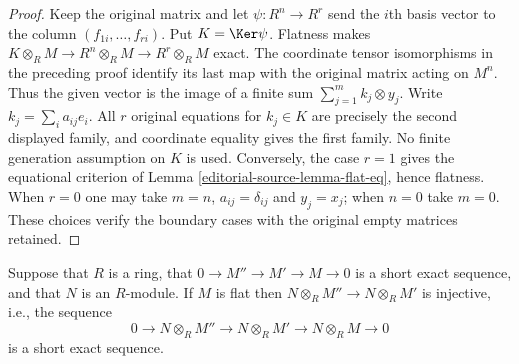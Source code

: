 \begin{proof}
Keep the original matrix and let
$\psi:R^n\to R^r$ send the $i$th basis vector to the
column $(f_{1i},\ldots,f_{ri})$. Put $K=\Ker\psi$.
Flatness makes
$K\otimes_R M\to R^n\otimes_R M\to R^r\otimes_R M$
exact. The coordinate tensor isomorphisms in the preceding
proof identify its last map with the original matrix
acting on $M^n$. Thus the given vector is the image of
a finite sum $\sum_{j=1}^m k_j\otimes y_j$.
Write $k_j=\sum_i a_{ij}e_i$. All $r$ original equations
for $k_j\in K$ are precisely the second displayed family,
and coordinate equality gives the first family. No finite
generation assumption on $K$ is used. Conversely, the case
$r=1$ gives the equational criterion
of Lemma \ref{editorial-source-lemma-flat-eq}, hence flatness. When $r=0$
one may take $m=n$, $a_{ij}=\delta_{ij}$ and $y_j=x_j$;
when $n=0$ take $m=0$. These choices verify the boundary
cases with the original empty matrices retained.
\end{proof}

\begin{lemma}
\label{editorial-source-lemma-flat-tor-zero}
Suppose that $R$ is a ring, that $0\to M''\to M'\to M\to0$
is a short exact sequence, and that $N$ is an $R$-module. If $M$ is flat
then $N \otimes_R M'' \to N \otimes_R M'$ is injective, i.e., the
sequence
$$
0 \to N \otimes_R M'' \to N \otimes_R M' \to N \otimes_R M \to 0
$$
is a short exact sequence.
\end{lemma}

